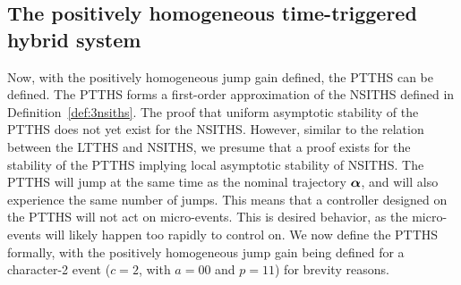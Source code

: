 \documentclass[../DC2017114Bouma.tex]{subfiles}
\begin{document}

\subsection{The positively homogeneous time-triggered hybrid system}\label{def:4PTTHS}
Now, with the positively homogeneous jump gain defined, the PTTHS can be defined. The PTTHS forms a first-order approximation of the NSITHS defined in Definition~\ref{def:3nsiths}. The proof that uniform asymptotic stability of the PTTHS does not yet exist for the NSITHS. However, similar to the relation between the LTTHS and NSITHS, we presume that a proof exists for the stability of the PTTHS implying local asymptotic stability of NSITHS. The PTTHS will jump at the same time as the nominal trajectory $\boldsymbol{\alpha}$, and will also experience the same number of jumps. This means that a controller designed on the PTTHS will not act on micro-events. This is desired behavior, as the micro-events will likely happen too rapidly to control on. We now define the PTTHS formally, with the positively homogeneous jump gain being defined for a character-2 event ($c = 2$, with $a = 00$ and $p=11$) for brevity reasons.
\end{document}

